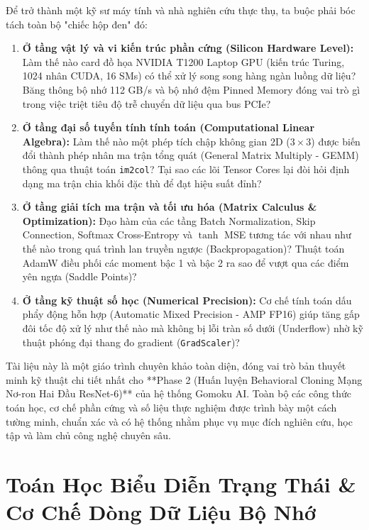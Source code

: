 \documentclass[11pt,a4paper]{report}
\begin{document}
Để trở thành một kỹ sư máy tính và nhà nghiên cứu thực thụ, ta buộc phải bóc tách toàn bộ "chiếc hộp đen" đó:
\begin{enumerate}
    \item \textbf{Ở tầng vật lý và vi kiến trúc phần cứng (Silicon Hardware Level):} Làm thế nào card đồ họa NVIDIA T1200 Laptop GPU (kiến trúc Turing, 1024 nhân CUDA, 16 SMs) có thể xử lý song song hàng ngàn luồng dữ liệu? Băng thông bộ nhớ 112 GB/s và bộ nhớ đệm Pinned Memory đóng vai trò gì trong việc triệt tiêu độ trễ chuyển dữ liệu qua bus PCIe?
    \item \textbf{Ở tầng đại số tuyến tính tính toán (Computational Linear Algebra):} Làm thế nào một phép tích chập không gian 2D ($3 \times 3$) được biến đổi thành phép nhân ma trận tổng quát (General Matrix Multiply - GEMM) thông qua thuật toán \texttt{im2col}? Tại sao các lõi Tensor Cores lại đòi hỏi định dạng ma trận chia khối đặc thù để đạt hiệu suất đỉnh?
    \item \textbf{Ở tầng giải tích ma trận và tối ưu hóa (Matrix Calculus \& Optimization):} Đạo hàm của các tầng Batch Normalization, Skip Connection, Softmax Cross-Entropy và $\tanh$ MSE tương tác với nhau như thế nào trong quá trình lan truyền ngược (Backpropagation)? Thuật toán AdamW điều phối các moment bậc 1 và bậc 2 ra sao để vượt qua các điểm yên ngựa (Saddle Points)?
    \item \textbf{Ở tầng kỹ thuật số học (Numerical Precision):} Cơ chế tính toán dấu phẩy động hỗn hợp (Automatic Mixed Precision - AMP FP16) giúp tăng gấp đôi tốc độ xử lý như thế nào mà không bị lỗi tràn số dưới (Underflow) nhờ kỹ thuật phóng đại thang đo gradient (\texttt{GradScaler})?
\end{enumerate}

Tài liệu này là một giáo trình chuyên khảo toàn diện, đóng vai trò bản thuyết minh kỹ thuật chi tiết nhất cho **Phase 2 (Huấn luyện Behavioral Cloning Mạng Nơ-ron Hai Đầu ResNet-6)** của hệ thống Gomoku AI. Toàn bộ các công thức toán học, cơ chế phần cứng và số liệu thực nghiệm được trình bày một cách tường minh, chuẩn xác và có hệ thống nhằm phục vụ mục đích nghiên cứu, học tập và làm chủ công nghệ chuyên sâu.

\tableofcontents
\newpage
{}

\chapter{Toán Học Biểu Diễn Trạng Thái \& Cơ Chế Dòng Dữ Liệu Bộ Nhớ}
\end{document}
